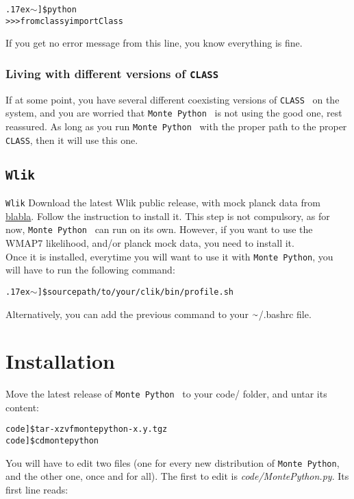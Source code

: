 \documentclass[10pt]{article}
\newcommand{\CLASS}{\texttt{CLASS}}
\newcommand{\MP}{\texttt{Monte Python}}
\newcommand{\Wlik}{\texttt{Wlik}}
\newcommand{\tild}{\raise.17ex\hbox{$\scriptstyle\mathtt{\sim}$}}
\begin{document}
  \begin{alltt}
    \tild]\$ python
    >>> from classy import Class
  \end{alltt}

  If you get no error message from this line, you know everything is fine.

  \subsubsection*{Living with different versions of \CLASS}

  If at some point, you have several different coexisting versions of \CLASS~ on
  the system, and you are worried that \MP~ is not using the good one,
  rest reassured. As long as you run \MP~ with the proper path to the
  proper \CLASS, then it will use this one.

  \subsection{\Wlik}

  \Wlik
  Download the latest Wlik public release, with mock planck data from
  \url{blabla}. Follow the instruction to install it. This step is not
  compulsory, as for now, \MP~ can run on its own. However, if you want
  to use the WMAP7 likelihood, and/or planck mock data, you need to install it.\\

  Once it is installed, everytime you will want to use it with \MP,
  you will have to run the following command:

  \begin{alltt}
    \tild]\$ source path/to/your/clik/bin/profile.sh
  \end{alltt}
  
  Alternatively, you can add the previous command to your $\tild$/.bashrc file.


\newpage
\section{Installation}

  Move the latest release of \MP~ to your code/ folder, and untar its
  content:

  \begin{alltt} 
    code]\$ tar -xzvf montepython-x.y.tgz 
    code]\$ cd montepython
  \end{alltt}

 You will have to edit two files (one for every new distribution of \MP, and
 the other one, once and for all). The first to edit is
 \emph{code/MontePython.py}. Its first line reads:
\end{document}
